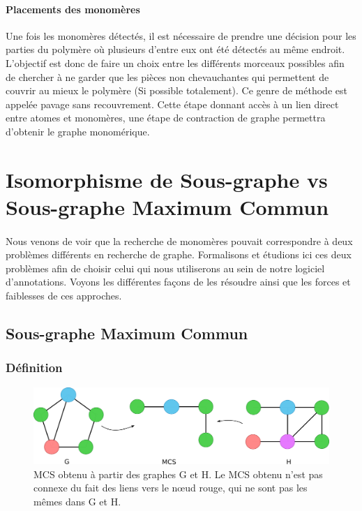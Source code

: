 \documentclass[12pt,french,twoside]{report}
\begin{document}
\paragraph{Placements des monomères}Une fois les monomères détectés, il est nécessaire de prendre une décision pour les parties du polymère où plusieurs d'entre eux ont été détectés au même endroit.
L'objectif est donc de faire un choix entre les différents morceaux possibles afin de chercher à ne garder que les pièces non chevauchantes qui permettent de couvrir au mieux le polymère (Si possible totalement).
Ce genre de méthode est appelée pavage sans recouvrement.
Cette étape donnant accès à un lien direct entre atomes et monomères, une étape de contraction de graphe permettra d'obtenir le graphe monomérique.




\section{Isomorphisme de Sous-graphe vs Sous-graphe Maximum Commun}

\paragraph{}Nous venons de voir que la recherche de monomères pouvait correspondre à deux problèmes différents en recherche de graphe.
Formalisons et étudions ici ces deux problèmes afin de choisir celui qui nous utiliserons au sein de notre logiciel d'annotations.
Voyons les différentes façons de les résoudre ainsi que les forces et faiblesses de ces approches.


\subsection{Sous-graphe Maximum Commun}

\subsubsection{Définition}

\begin{figure}[!ht]
  \begin{center}
    \includegraphics[width=450px]{Figures/s2m/MCS-SI/mcs.png}
    \caption{\label{mcs_fig}MCS obtenu à partir des graphes G et H.
    Le MCS obtenu n'est pas connexe du fait des liens vers le n\oe{}ud rouge, qui ne sont pas les mêmes dans G et H.}
  \end{center}
\end{figure}
\end{document}
